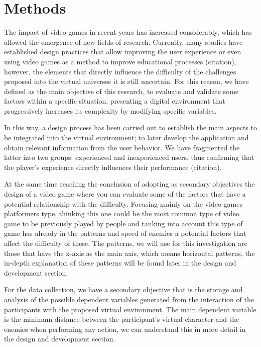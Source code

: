 
\chapter{Methods}

The impact of video games in recent years has increased considerably, which has allowed the emergence of new fields of research. Currently, many studies have established design practices that allow improving the user experience or even using video games as a method to improve educational processes (citation), however, the elements that directly influence the difficulty of the challenges proposed into the virtual universes it is still uncertain. For this reason, we have defined as the main objective of this research, to evaluate and validate some factors within a specific situation, presenting a digital environment that progressively increases its complexity by modifying specific variables.

In this way, a design process has been carried out to establish the main aspects to be integrated into the virtual environment; to later develop the application and obtain relevant information from the user behavior. We have fragmented the latter into two groups: experienced and inexperienced users, thus confirming that the player's experience directly influences their performance (citation).

At the same time reaching the conclusion of adopting as secondary objectives the design of a video game where you can evaluate some of the factors that have a potential relationship with the difficulty. Focusing mainly on the video games platformers type, thinking this one could be the most common type of video game to be previously played by people and tanking into account this type of game has already in the patterns and speed of enemies a potential factors that affect the difficulty of these. The patterns, we will use for this investigation are those that have the x-axis as the main axis, which means horizontal patterns, the in-depth explanation of these patterns will be found later in the design and development section.

For the data collection, we have a secondary objective that is the storage and analysis of the possible dependent variables generated from the interaction of the participants with the proposed virtual environment. The main dependent variable is the minimum distance between the participant's virtual character and the enemies when performing any action, we can understand this in more detail in the design and development section.

